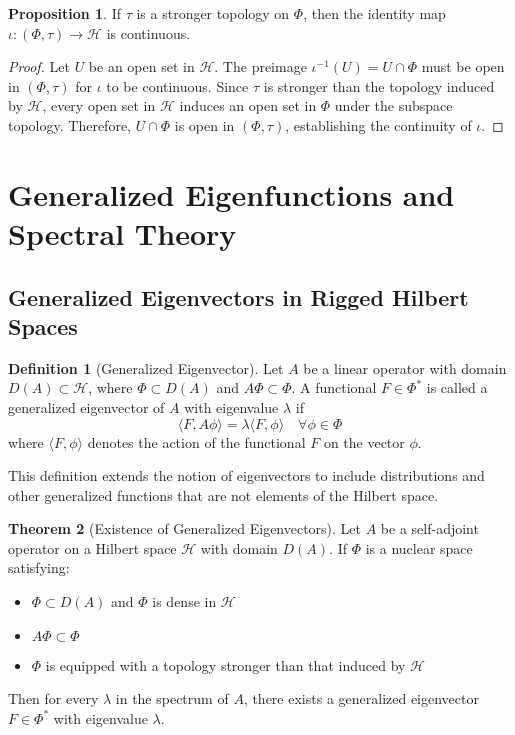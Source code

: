 \documentclass[12pt,a4paper]{article}
\theoremstyle{definition}
\newtheorem{definition}{Definition}
\newtheorem{theorem}{Theorem}
\newtheorem{proposition}[theorem]{Proposition}
\begin{document}
\begin{proposition}
If $\tau$ is a stronger topology on $\Phi$, then the identity map $\iota: (\Phi, \tau) \to \mathcal{H}$ is continuous.
\end{proposition}

\begin{proof}
Let $U$ be an open set in $\mathcal{H}$. The preimage $\iota^{-1}(U) = U \cap \Phi$ must be open in $(\Phi, \tau)$ for $\iota$ to be continuous. Since $\tau$ is stronger than the topology induced by $\mathcal{H}$, every open set in $\mathcal{H}$ induces an open set in $\Phi$ under the subspace topology. Therefore, $U \cap \Phi$ is open in $(\Phi, \tau)$, establishing the continuity of $\iota$.
\end{proof}

\section{Generalized Eigenfunctions and Spectral Theory}

\subsection{Generalized Eigenvectors in Rigged Hilbert Spaces}

\begin{definition}[Generalized Eigenvector]
Let $A$ be a linear operator with domain $D(A) \subset \mathcal{H}$, where $\Phi \subset D(A)$ and $A\Phi \subset \Phi$. A functional $F \in \Phi^*$ is called a generalized eigenvector of $A$ with eigenvalue $\lambda$ if
\begin{equation}
    \langle F, A\phi \rangle = \lambda \langle F, \phi \rangle \quad \forall \phi \in \Phi
\end{equation}
where $\langle F, \phi \rangle$ denotes the action of the functional $F$ on the vector $\phi$.
\end{definition}

This definition extends the notion of eigenvectors to include distributions and other generalized functions that are not elements of the Hilbert space.

\begin{theorem}[Existence of Generalized Eigenvectors]
Let $A$ be a self-adjoint operator on a Hilbert space $\mathcal{H}$ with domain $D(A)$. If $\Phi$ is a nuclear space satisfying:
\begin{itemize}
    \item $\Phi \subset D(A)$ and $\Phi$ is dense in $\mathcal{H}$
    \item $A\Phi \subset \Phi$
    \item $\Phi$ is equipped with a topology stronger than that induced by $\mathcal{H}$
\end{itemize}
Then for every $\lambda$ in the spectrum of $A$, there exists a generalized eigenvector $F \in \Phi^*$ with eigenvalue $\lambda$.
\end{theorem}
\end{document}
